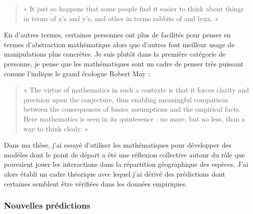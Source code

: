 \begin{quote}
« It just so happens that some people find it easier to think about
things in terms of x's and y's, and other in terms rabbits of and lynx.
»
\end{quote}

En d'autres termes, certaines personnes ont plus de facilités pour
penser en termes d'abstraction mathématique alors que d'autres font
meilleur usage de manipulations plus concrètes. Je suis plutôt dans la
première catégorie de personne, je pense que les mathématiques sont un
cadre de penser très puissant comme l'indique le grand écologue Robert
May \citep{May2004}:

\begin{quote}
« The virtue of mathematics in such a contexte is that it forces clarity
and precision upon the conjecture, thus enabling meaningful comparison
between the consequences of basics assumptions and the empirical facts.
Here mathematics is seen in its quintesence : no more, but no less, than
a way to think clealy. »
\end{quote}

Dans ma thèse, j'ai essayé d'utiliser les mathématiques pour développer
des modèles dont le point de départ a été une réflexion collective
autour du rôle que pouvaient jouer les interactions dans la répartition
géographique des espèces. J'ai alors établi un cadre théorique avec
lequel j'ai dérivé des prédictions dont certaines semblent être
vérifiées dans les données empiriques.

\subsubsection*{Nouvelles prédictions}\label{nouvelles-pruxe9dictions}

